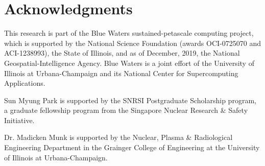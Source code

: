 \section*{Acknowledgments}

This research is part of the Blue Waters sustained-petascale computing project,
which is supported by the National Science Foundation (awards OCI-0725070 and
ACI-1238993), the State of Illinois, and as of December, 2019, the National
Geospatial-Intelligence Agency. Blue Waters is a joint effort of the University
of Illinois at Urbana-Champaign and its National Center for Supercomputing
Applications.

Sun Myung Park is supported by the SNRSI Postgraduate Scholarship program, a
graduate fellowship program from the Singapore Nuclear Research \& Safety
Initiative.

Dr. Madicken Munk is supported by the Nuclear, Plasma \& Radiological
Engineering Department in the Grainger College of Engineering at the University
of Illinois at Urbana-Champaign.
